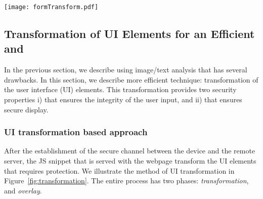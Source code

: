 \begin{figure*}[t]
\centering
\texttt{[image: formTransform.pdf]}
\caption{\textbf{Transformation of UI elements.} Automated transformation of the UI elements (\one) by the \name JavaScript snippets that detects the presence of the device. The corresponding \html source shows the UI elements that requires integrity/privacy protection. These UI elements are transformed into a QR code (\two). The QR code encodes a UI specification that recreates the transformed UI. Specification~\ref{snippet:UISpecification} shows the corresponding UI specification that is created by the \name \js code. The QR code is then decoded and overlaid (\three) on the HDMI stream by the \device. Upon the user's action on the overlaid UI elements, the device signs all the input data and send them to the remote server. As the rendered UI is generated and overlaid by the \device, it also ensures the integrity of the UI elements. Note that the intermediate QR code transformation (\two) is not visible by the user as it is decoded instantaneously by the device.}
\label{fig:transformation}
\end{figure*}


\subsection{Transformation of UI Elements for an Efficient \Poa and \Poui}
\label{sec:systemDesign:transformation}

In the previous section, we describe \poa using image/text analysis that has several drawbacks. In this section, we describe more efficient technique: transformation of the user interface (UI) elements. This transformation provides two security properties i) \poa that ensures the integrity of the user input, and ii) \poui that ensures secure display.


\subsubsection{UI transformation based approach} After the establishment of the secure channel between the device and the remote server, the \name JS snippet that is served with the webpage transform the UI elements that requires protection. We illustrate the method of UI transformation in Figure~\ref{fig:transformation}. The entire process has two phases: \emph{transformation}, and \emph{overlay}.



